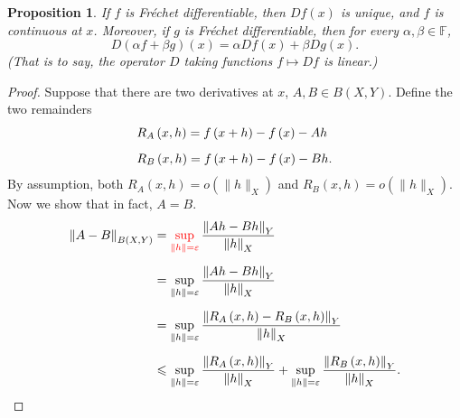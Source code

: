 \documentclass[letterpaper,twoside,12pt]{article}
\theoremstyle{mystyle}
\newtheorem{prop}{Proposition}[section]
\newcommand{\cbk}{\color{black}}
\newcommand{\cred}{\color{red}}
\begin{document}
  \begin{tcolorbox}[colback=red!5!white,colframe=red!75!black]
    \begin{prop}
      If $f$ is Fr\'echet differentiable, then $Df(x)$ is unique, and $f$ is continuous at $x$. Moreover, if $g$ is Fr\'echet differentiable, then for every $\alpha, \beta \in \mathbb F$, 
      \[D\left( \alpha f + \beta g \right)(x) = \alpha Df(x) + \beta Dg(x).\]
      (That is to say, the operator $D$ taking functions $f \mapsto Df$ is linear.) 
    \end{prop}
  \end{tcolorbox}
  \begin{proof}
    Suppose that there are two derivatives at $x$, $A, B \in B(X, Y)$. Define the two remainders
    \begin{equation}
      \begin{gathered}
        {R_A}\left( {x,h} \right) = f\left( {x + h} \right) - f\left( x \right) - Ah \hfill \\[.2cm]
        {R_B}\left( {x,h} \right) = f\left( {x + h} \right) - f\left( x \right) - Bh. 
      \end{gathered} 
    \end{equation}
    By assumption, both $R_A(x,h) = o\left( \|h\|_X \right)$ and $R_B(x, h) = o\left( \|h\|_X \right)$. Now we show that in fact, $A = B$. 
    \begin{equation}
      \begin{split}
        {\left\| {A - B} \right\|_{B\left( {X,Y} \right)}} &= \cred \mathop {\sup }\limits_{\left\| h \right\| = \varepsilon }\cbk  \frac{{{{\left\| {Ah - Bh} \right\|}_Y}}}{{{{\left\| h \right\|}_X}}} \hfill \\[.2cm]
        &= \mathop {\sup }\limits_{\left\| h \right\| = \varepsilon } \frac{{{{\left\| {Ah - Bh} \right\|}_Y}}}{{{{\left\| h \right\|}_X}}} \hfill \\[.2cm]
        &= \mathop {\sup }\limits_{\left\| h \right\| = \varepsilon } \frac{{{{\left\| {{R_A}\left( {x,h} \right) - {R_B}\left( {x,h} \right)} \right\|}_Y}}}{{{{\left\| h \right\|}_X}}} \hfill \\[.2cm]
        &\leqslant \mathop {\sup }\limits_{\left\| h \right\| = \varepsilon } \frac{{{{\left\| {{R_A}\left( {x,h} \right)} \right\|}_Y}}}{{{{\left\| h \right\|}_X}}} + \mathop {\sup }\limits_{\left\| h \right\| = \varepsilon } \frac{{{{\left\| {{R_B}\left( {x,h} \right)} \right\|}_Y}}}{{{{\left\| h \right\|}_X}}} .
      \end{split}
    \end{equation}

\end{proof}
\end{document}
